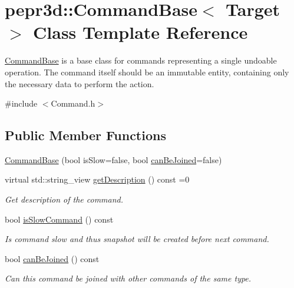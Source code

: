\hypertarget{classpepr3d_1_1_command_base}{}\section{pepr3d\+::Command\+Base$<$ Target $>$ Class Template Reference}
\label{classpepr3d_1_1_command_base}


\mbox{\hyperlink{classpepr3d_1_1_command_base}{Command\+Base}} is a base class for commands representing a single undoable operation. The command itself should be an immutable entity, containing only the necessary data to perform the action.  




{\ttfamily \#include $<$Command.\+h$>$}

\subsection*{Public Member Functions}
\begin{DoxyCompactItemize}
\item 
\mbox{\hyperlink{classpepr3d_1_1_command_base_aa4644cac610c68ac671fbf04af61186f}{Command\+Base}} (bool is\+Slow=false, bool \mbox{\hyperlink{classpepr3d_1_1_command_base_aead9aa5e9149a485497805aa1a4527bf}{can\+Be\+Joined}}=false)
\item 
\mbox{\label{classpepr3d_1_1_command_base_a0b01d47e5d418d3c2e0aba612c88f42b}} 
virtual std\+::string\+\_\+view \mbox{\hyperlink{classpepr3d_1_1_command_base_a0b01d47e5d418d3c2e0aba612c88f42b}{get\+Description}} () const =0
\begin{DoxyCompactList}\small\item\em Get description of the command. \end{DoxyCompactList}\item 
\mbox{\label{classpepr3d_1_1_command_base_a861152ab2c31b4257cf99e351da91418}} 
bool \mbox{\hyperlink{classpepr3d_1_1_command_base_a861152ab2c31b4257cf99e351da91418}{is\+Slow\+Command}} () const
\begin{DoxyCompactList}\small\item\em Is command slow and thus snapshot will be created before next command. \end{DoxyCompactList}\item 
\mbox{\label{classpepr3d_1_1_command_base_aead9aa5e9149a485497805aa1a4527bf}} 
bool \mbox{\hyperlink{classpepr3d_1_1_command_base_aead9aa5e9149a485497805aa1a4527bf}{can\+Be\+Joined}} () const
\begin{DoxyCompactList}\small\item\em Can this command be joined with other commands of the same type. \end{DoxyCompactList}\end{DoxyCompactItemize}
